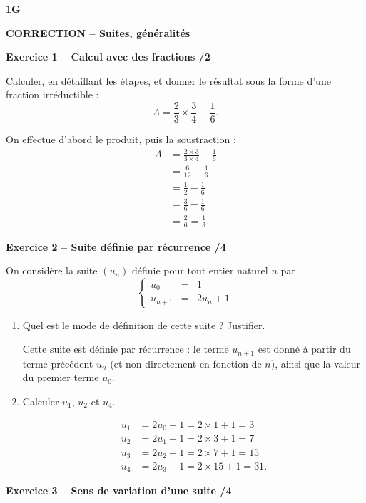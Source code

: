 \documentclass[10pt,a4paper]{article}
\renewcommand{\niveau}{1G}
\renewcommand{\chapitre}{Suites, généralités}
\renewcommand{\interroversion}[1]{
    \noindent\textbf{\niveau}

    \vspace{-0.5cm}
    \begin{center}
        \textbf{\large CORRECTION -- \chapitre}
    \end{center}

    \vspace{0.1cm}
}
\begin{document}

\interroversion{A}

\textbf{Exercice 1 -- Calcul avec des fractions \hfill /2}

Calculer, en détaillant les étapes, et donner le résultat sous la forme d'une fraction irréductible :
\[
A = \frac{2}{3}\times\frac{3}{4}-\frac{1}{6}.
\]

On effectue d'abord le produit, puis la soustraction :
\[
\begin{aligned}
A &= \frac{2\times3}{3\times4}-\frac{1}{6}\\
  &= \frac{6}{12}-\frac{1}{6}\\
  &= \frac{1}{2}-\frac{1}{6}\\
  &= \frac{3}{6}-\frac{1}{6}\\
  &= \frac{2}{6}=\frac{1}{3}.
\end{aligned}
\]

\textbf{Exercice 2 -- Suite définie par récurrence \hfill /4}

On considère la suite \((u_n)\) définie pour tout entier naturel \(n\) par
\[
\left\{\begin{array}{rcl}
u_0 &=& 1 \\
u_{n+1} &=& 2u_n+1
\end{array}\right.
\]

\begin{enumerate}
\item Quel est le mode de définition de cette suite ? Justifier.

Cette suite est définie par récurrence : le terme \(u_{n+1}\) est donné à partir du terme précédent \(u_n\) (et non directement en fonction de \(n\)), ainsi que la valeur du premier terme \(u_0\).

\item Calculer \(u_1\), \(u_2\) et \(u_4\).

\[
\begin{aligned}
u_1 &= 2u_0+1 = 2\times1+1 = 3\\
u_2 &= 2u_1+1 = 2\times3+1 = 7\\
u_3 &= 2u_2+1 = 2\times7+1 = 15\\
u_4 &= 2u_3+1 = 2\times15+1 = 31.
\end{aligned}
\]
\end{enumerate}

\textbf{Exercice 3 -- Sens de variation d'une suite \hfill /4}
\end{document}

